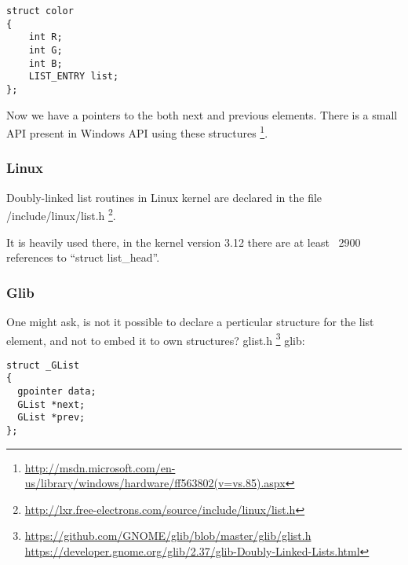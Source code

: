 \begin{lstlisting}
struct color
{
	int R;
	int G;
	int B;
	LIST_ENTRY list;
};
\end{lstlisting}

{Now we have a pointers to the both next and previous elements}.
{There is a small API present in Windows API using these structures}
\footnote{\url{http://msdn.microsoft.com/en-us/library/windows/hardware/ff563802(v=vs.85).aspx}}.

\subsubsection{Linux}

{Doubly-linked list routines in Linux kernel are declared in the file} /include/linux/list.h
\footnote{\url{http://lxr.free-electrons.com/source/include/linux/list.h}}.

{It is heavily used there, in the kernel version 3.12 there are at least ~2900 references to} 
``struct list\_head''.

\subsubsection{Glib}

{One might ask, is not it possible to declare a perticular structure for the list element,
and not to embed it to own structures}?
 glist.h
\footnote{\url{https://github.com/GNOME/glib/blob/master/glib/glist.h} 
\url{https://developer.gnome.org/glib/2.37/glib-Doubly-Linked-Lists.html}} \InENRU glib:

\begin{lstlisting}
struct _GList
{
  gpointer data;
  GList *next;
  GList *prev;
};
\end{lstlisting}

